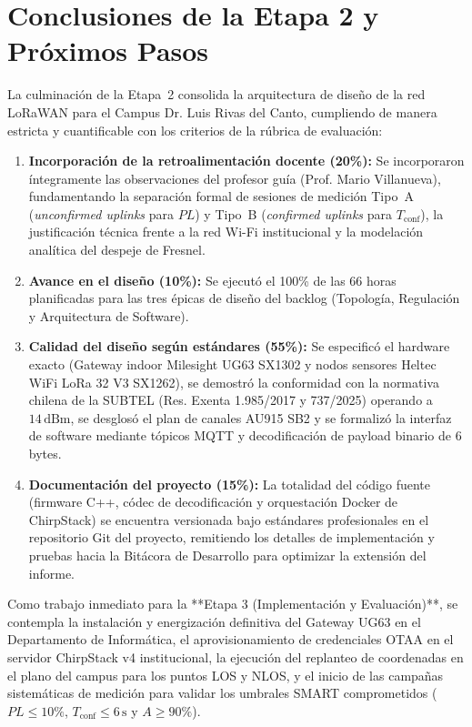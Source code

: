 \documentclass[12pt,oneside,openany,spanish,oldfontcommands]{memoir}
\begin{document}
\chapter{Conclusiones de la Etapa 2 y Próximos Pasos}\label{cap:conclusiones-etapa2}

La culminación de la Etapa~2 consolida la arquitectura de diseño de la red LoRaWAN para el
Campus Dr. Luis Rivas del Canto, cumpliendo de manera estricta y cuantificable con los criterios
de la rúbrica de evaluación:
\begin{enumerate}
    \item \textbf{Incorporación de la retroalimentación docente (20\%):} Se incorporaron
    íntegramente las observaciones del profesor guía (Prof. Mario Villanueva), fundamentando
    la separación formal de sesiones de medición Tipo~A (\textit{unconfirmed uplinks} para $PL$)
    y Tipo~B (\textit{confirmed uplinks} para $T_{\text{conf}}$), la justificación técnica
    frente a la red Wi-Fi institucional y la modelación analítica del despeje de Fresnel.
    \item \textbf{Avance en el diseño (10\%):} Se ejecutó el 100\% de las 66 horas planificadas
    para las tres épicas de diseño del backlog (Topología, Regulación y Arquitectura de Software).
    \item \textbf{Calidad del diseño según estándares (55\%):} Se especificó el hardware exacto
    (Gateway indoor Milesight UG63 SX1302 y nodos sensores Heltec WiFi LoRa 32 V3 SX1262), se
    demostró la conformidad con la normativa chilena de la SUBTEL (Res. Exenta 1.985/2017 y
    737/2025) operando a $14\,\text{dBm}$, se desglosó el plan de canales AU915 SB2 y se
    formalizó la interfaz de software mediante tópicos MQTT y decodificación de payload binario de 6 bytes.
    \item \textbf{Documentación del proyecto (15\%):} La totalidad del código fuente (firmware C++,
    códec de decodificación y orquestación Docker de ChirpStack) se encuentra versionada bajo
    estándares profesionales en el repositorio Git del proyecto, remitiendo los detalles de
    implementación y pruebas hacia la Bitácora de Desarrollo para optimizar la extensión del informe.
\end{enumerate}

Como trabajo inmediato para la **Etapa 3 (Implementación y Evaluación)**, se contempla la
instalación y energización definitiva del Gateway UG63 en el Departamento de Informática, el
aprovisionamiento de credenciales OTAA en el servidor ChirpStack v4 institucional, la ejecución
del replanteo de coordenadas en el plano del campus para los puntos LOS y NLOS, y el inicio de
las campañas sistemáticas de medición para validar los umbrales SMART comprometidos ($PL \leq 10\%$,
$T_{\mathrm{conf}} \leq 6\,\text{s}$ y $A \geq 90\%$).
\end{document}
